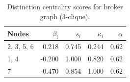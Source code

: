 \begin{table}
\centering
\caption{\label{tab:b3}Distinction centrality scores for broker graph (3-clique).}
\centering
\begin{tabular}[t]{lrrrr}
\toprule
Nodes & $\beta_i$ & $s_i$ & $\kappa_i$ & $\alpha$\\
\midrule
2, 3, 5, 6 & 0.218 & 0.745 & 0.244 & 0.62\\
1, 4 & -0.200 & 1.000 & 0.820 & 0.62\\
7 & -0.470 & 0.854 & 1.000 & 0.62\\
\bottomrule
\end{tabular}
\end{table}
